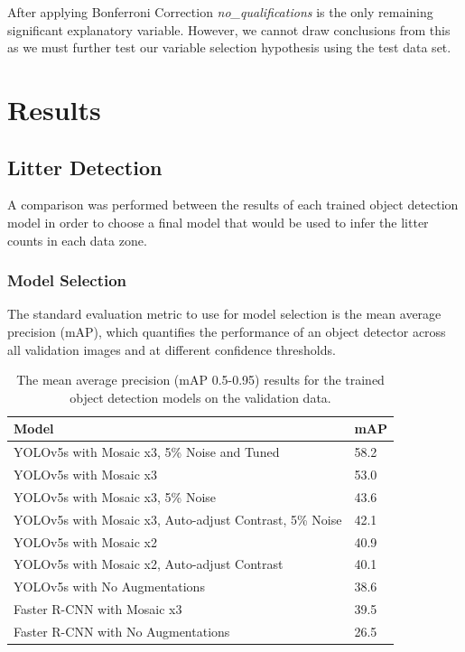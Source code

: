 \documentclass{thesis}
\begin{document}
After applying Bonferroni Correction \textit{no\_qualifications} is the only remaining significant explanatory variable. However, we cannot draw conclusions from this as we must further test our variable selection hypothesis using the test data set.


\chapter{Results} \label{chapter:results}

\section{Litter Detection}

A comparison was performed between the results of each trained object detection model in order to choose a final model that would be used to infer the litter counts in each data zone.

\subsection{Model Selection}

The standard evaluation metric to use for model selection is the mean average precision (mAP), which quantifies the performance of an object detector across all validation images and at different confidence thresholds.

\begin{table}[ht!]
    \centering
    \begin{tabular}{|l| |l|} 
     \hline
     \textbf{Model} & \textbf{mAP} \\
     \hline\hline
     YOLOv5s with Mosaic x3, 5\% Noise and Tuned & 58.2 \\
     YOLOv5s with Mosaic x3 & 53.0 \\
     YOLOv5s with Mosaic x3, 5\% Noise & 43.6 \\
     YOLOv5s with Mosaic x3, Auto-adjust Contrast, 5\% Noise & 42.1 \\
     YOLOv5s with Mosaic x2 & 40.9  \\
     YOLOv5s with Mosaic x2, Auto-adjust Contrast & 40.1  \\
     YOLOv5s with No Augmentations & 38.6 \\
     Faster R-CNN with Mosaic x3 & 39.5 \\
     Faster R-CNN with No Augmentations & 26.5 \\
     \hline
    \end{tabular}
    \vspace{2mm}
    \caption{The mean average precision (mAP 0.5-0.95) results for the trained object detection models on the validation data.}
    \label{table:model-mAP}
\end{table}
\end{document}
